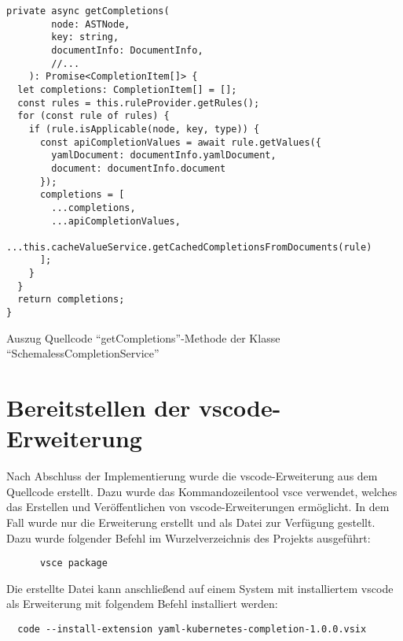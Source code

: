 \begin{listing}[t]
  \begin{verbatim}
private async getCompletions(
        node: ASTNode,
        key: string,
        documentInfo: DocumentInfo,
        //...
    ): Promise<CompletionItem[]> {
  let completions: CompletionItem[] = [];
  const rules = this.ruleProvider.getRules();
  for (const rule of rules) {
    if (rule.isApplicable(node, key, type)) {
      const apiCompletionValues = await rule.getValues({
        yamlDocument: documentInfo.yamlDocument,
        document: documentInfo.document
      });
      completions = [
        ...completions,
        ...apiCompletionValues,
        ...this.cacheValueService.getCachedCompletionsFromDocuments(rule)
      ];
    }
  }
  return completions;
}
      \end{verbatim}
  \caption{Auszug Quellcode ``getCompletions''-Methode der Klasse ``SchemalessCompletionService''}
  \label{lst:get-completions-schemaless-completion-service}
\end{listing}

\FloatBarrier

\section{Bereitstellen der \acs{vscode}-Erweiterung}

Nach Abschluss der Implementierung wurde die \acs{vscode}-Erweiterung aus dem Quellcode erstellt.
Dazu wurde das Kommandozeilentool \ac{vsce} verwendet, welches das Erstellen und Veröffentlichen von
\acs{vscode}-Erweiterungen ermöglicht. In dem Fall wurde nur die Erweiterung erstellt und als
Datei zur Verfügung gestellt.
Dazu wurde folgender Befehl im Wurzelverzeichnis des Projekts ausgeführt:
\begin{verbatim}
      vsce package
\end{verbatim}
Die erstellte Datei kann anschließend auf einem System mit installiertem \ac{vscode} als
Erweiterung mit folgendem Befehl installiert werden:
\begin{verbatim}
  code --install-extension yaml-kubernetes-completion-1.0.0.vsix
\end{verbatim}

